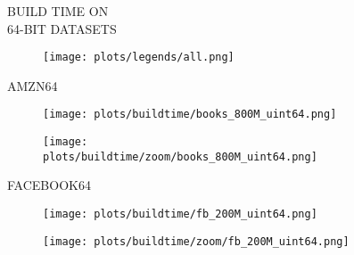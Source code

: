 \documentclass{article}
\begin{document}
\begin{figure}[!htbp]
\fbox
{
\begin{minipage}[t][0.98\textheight][t]{\textwidth}
\centering
    \begin{minipage}{0.2\linewidth}
    \footnotesize{BUILD TIME ON  \\ 64-BIT DATASETS}
    \end{minipage}
   \begin{minipage}{0.75\linewidth}
        \begin{figure}[H]
        \texttt{[image: plots/legends/all.png]}
        \end{figure}
    \end{minipage}
    \vspace*{-10px}
    
    \begin{minipage}{0.03\linewidth}
    \begin{sideways}\small AMZN64\end{sideways}
    \end{minipage}
    \begin{minipage}{0.39\linewidth}
        \begin{figure}[H]
        \texttt{[image: plots/buildtime/books\_800M\_uint64.png]}
        \end{figure}
    \end{minipage}
    \begin{minipage}{0.39\linewidth}
        \begin{figure}[H]
            \texttt{[image: plots/buildtime/zoom/books\_800M\_uint64.png]}
        \end{figure}
    \end{minipage}
\vspace*{-0.55cm}

\begin{minipage}{0.03\linewidth}
    \begin{sideways}\small FACEBOOK64\end{sideways}
    \end{minipage}
    \begin{minipage}{0.39\linewidth}
        \begin{figure}[H]
        \texttt{[image: plots/buildtime/fb\_200M\_uint64.png]}
        \end{figure}
    \end{minipage}
    \begin{minipage}{0.39\linewidth}
        \begin{figure}[H]
            \texttt{[image: plots/buildtime/zoom/fb\_200M\_uint64.png]}
        \end{figure}
    \end{minipage}
\vspace*{-0.55cm}


\end{minipage}}
\end{figure}
\end{document}
